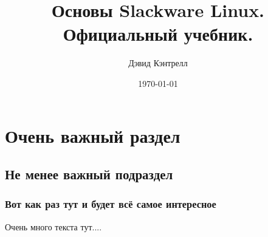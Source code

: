 \documentclass[a4paper,10pt,notitlepage,twoside,openany]{book}
\author{Дэвид Кэнтрелл}
\title{Основы Slackware Linux. Официальный учебник.}
\date{\today}
\begin{document}
\maketitle
\tableofcontents
\chapter{Очень важный раздел}
\section{Не менее важный подраздел}
\subsection{Вот как раз тут и будет всё самое интересное}
Очень много текста тут....
\end{document}
